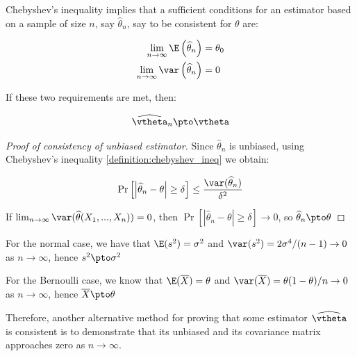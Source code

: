 \documentclass[english,12pt]{book}\usepackage[]{graphicx}\usepackage[]{xcolor}
\begin{document}
\begin{theorem}\label{teo:chebyshev}
Chebyshev's inequality implies that a sufficient conditions for an estimator based on a sample of size $n$, say $\widehat{\theta}_n$, say to be consistent for $\theta$ are:

\begin{equation*}
  \begin{aligned}
    \lim_{n \to \infty} \E\left(\widehat{\theta}_n\right) & = \theta_0 \\
    \lim_{n \to \infty} \var\left(\widehat{\theta}_n\right)& = 0
  \end{aligned}
\end{equation*}

If these two requirements are met, then:

\begin{equation*}
\widehat{\vtheta}_n\pto \vtheta
\end{equation*}
\end{theorem}

\begin{proof}[Proof of consistency of unbiased estimator]
  Since $\widehat{\theta}_n$ is unbiased, using Chebyshev's inequality \ref{definition:chebyshev_ineq} we obtain:
  
  \begin{equation*}
    \Pr\left[\left| \widehat{\theta}_n - \theta\right|\geq \delta \right]\leq \frac{\var(\widehat{\theta}_n)}{\delta ^2}
  \end{equation*}
  
  If $\lim_{n\to\infty}\var(\widehat{\theta}(X_1,...,X_n)) = 0$, then $\Pr\left[\left| \widehat{\theta}_n - \theta\right|\geq \delta \right]\to 0$, so $\widehat{\theta}_n\pto \theta$
\end{proof}

\begin{example}
For the normal case, we have that $\E(s^2) = \sigma^2$ and $\var(s^2) = 2\sigma^4 / (n - 1)\to 0$ as $n\to \infty$, hence $s^2\pto \sigma^2$
\end{example}


\begin{example}
For the Bernoulli case, we know that $\E(\overline{X}) = \theta$ and $\var(\overline{X}) = \theta (1- \theta)/ n \to 0$ as $n\to \infty$, hence $\overline{X}\pto \theta$
\end{example}

Therefore, another alternative method for proving that some estimator $\widehat{\vtheta}$ is consistent is to demonstrate that its unbiased and its covariance matrix approaches zero as $n\to\infty$.
\end{document}
